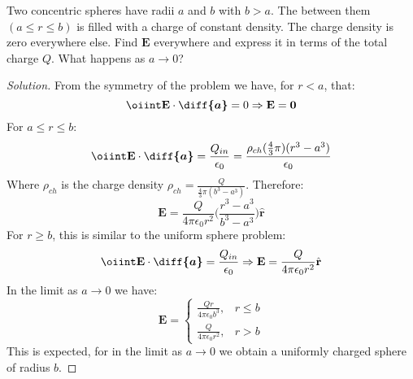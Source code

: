 \documentclass[crop=false,class=book,oneside]{standalone}
\begin{document}
            \begin{problem}[Wangsness 4-6]
                Two concentric spheres have radii $a$ and $b$ with $b>a$.
                The between them $(a\leq{r}\leq{b})$ is filled with a
                charge of constant density. The charge density is zero
                everywhere else. Find $\mathbf{E}$ everywhere and express
                it in terms of the total charge $Q$.
                What happens as $a\rightarrow{0}$?
            \end{problem}
            \begin{proof}[Solution]
                From the symmetry of the problem we have, for $r<a$, that:
                \begin{equation*}
                    \oiint\mathbf{E}\cdot\boldsymbol{\diff{a}}
                    =0\Rightarrow\mathbf{E}=\mathbf{0}
                \end{equation*}
                For $a\leq{r}\leq{b}$:
                \begin{equation*}
                    \oiint\mathbf{E}\cdot\boldsymbol{\diff{a}}
                    =\frac{Q_{in}}{\epsilon_{0}}
                    =\frac{\rho_{ch}(\frac{4}{3}\pi)(r^{3}-a^{3})}
                          {\epsilon_0}    
                \end{equation*}
                Where $\rho_{ch}$ is the charge density
                $\rho_{ch}=\frac{Q}{\frac{4}{3}\pi(b^{3}-a^{3})}$.
                Therefore:
                \begin{equation*}
                    \mathbf{E}
                    =\frac{Q}{4\pi\epsilon_{0}r^{2}}
                    \bigg(\frac{r^{3}-a^{3}}{b^{3}-a^{3}}\bigg)
                    \hat{\mathbf{r}}
                \end{equation*}
                For $r\geq b$, this is similar to
                the uniform sphere problem:
                \begin{equation*}
                    \oiint\mathbf{E}\cdot\boldsymbol{\diff{a}}
                    =\frac{Q_{in}}{\epsilon_{0}}
                    \Rightarrow\mathbf{E}
                    =\frac{Q}{4\pi\epsilon_{0}r^{2}}\hat{\mathbf{r}}
                \end{equation*}
                In the limit as $a\rightarrow{0}$ we have:
                \begin{equation*}
                    \mathbf{E}=
                    \begin{cases}
                        \frac{Qr}{4\pi\epsilon_{0}b^{3}},&r\leq b\\
                        \frac{Q}{4\pi\epsilon_{0}r^{2}},&r>b
                    \end{cases}
                \end{equation*}
                This is expected, for in the limit as
                $a\rightarrow 0$ we obtain a uniformly
                charged sphere of radius $b$.
            \end{proof}
\end{document}
